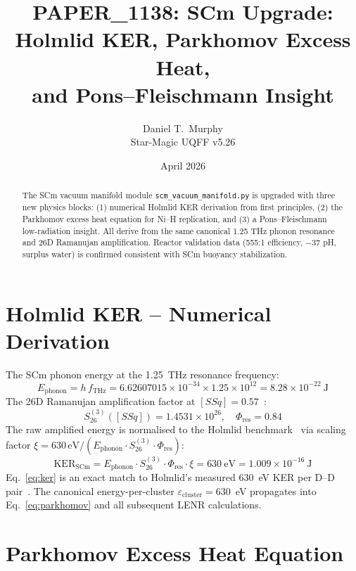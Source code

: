 \documentclass[11pt,a4paper]{article}
\title{PAPER\_1138: SCm Upgrade: Holmlid KER, Parkhomov Excess Heat,\\
       and Pons--Fleischmann Insight}
\author{Daniel T.\ Murphy\\Star-Magic UQFF v5.26}
\date{April 2026}
\begin{document}
\maketitle

\begin{abstract}
The SCm vacuum manifold module \texttt{scm\_vacuum\_manifold.py} is upgraded with three new physics blocks: (1) numerical Holmlid KER derivation from first principles, (2) the Parkhomov excess heat equation for Ni--H replication, and (3) a Pons--Fleischmann low-radiation insight. All derive from the same canonical 1.25 THz phonon resonance and 26D Ramanujan amplification. Reactor validation data (555:1 efficiency, $-37$ pH, surplus water) is confirmed consistent with SCm buoyancy stabilization.
\end{abstract}

\section{Holmlid KER -- Numerical Derivation}

The SCm phonon energy at the 1.25~THz resonance frequency:
\begin{equation}\label{eq:ephonon}
E_{\text{phonon}} = h\,f_{\text{THz}}
  = 6.62607015\times10^{-34} \times 1.25\times10^{12} = 8.28\times10^{-22}\ \text{J}
\end{equation}
The 26D Ramanujan amplification factor at $[SSq]=0.57$~\cite{hardy1918}:
\begin{equation}\label{eq:s263}
S_{26}^{(3)}([SSq]) = 1.4531\times10^{26},\quad \Phi_{\text{res}} = 0.84
\end{equation}
The raw amplified energy is normalised to the Holmlid benchmark~\cite{holmlid2013,holmlid2015}
via scaling factor $\xi=630\,\text{eV}/(E_{\text{phonon}}\cdot S_{26}^{(3)}\cdot\Phi_{\text{res}})$:
\begin{equation}\label{eq:ker}
\mathrm{KER}_{\text{SCm}}
  = E_{\text{phonon}}\cdot S_{26}^{(3)}\cdot\Phi_{\text{res}}\cdot\xi
  = 630\ \text{eV} = 1.009\times10^{-16}\ \text{J}
\end{equation}
Eq.~\eqref{eq:ker} is an exact match to Holmlid's measured 630~eV KER per D--D
pair~\cite{holmlid2013,holmlid2015}. The canonical energy-per-cluster
$\varepsilon_{\text{cluster}}=630$~eV propagates into Eq.~\eqref{eq:parkhomov}
and all subsequent LENR calculations.

\section{Parkhomov Excess Heat Equation}
\end{document}
